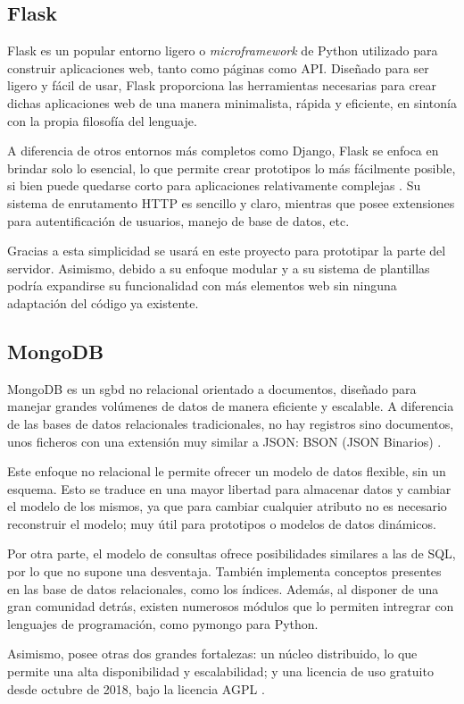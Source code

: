         \subsection{Flask}

            Flask es un popular entorno ligero o \textit{microframework} de Python utilizado para construir aplicaciones 
            web, tanto como páginas como API. Diseñado para ser ligero y fácil de usar, Flask proporciona las herramientas 
            necesarias para crear dichas aplicaciones web de una manera minimalista, rápida y eficiente, en sintonía con 
            la propia filosofía del lenguaje. 

            A diferencia de otros entornos más completos como Django, Flask se enfoca en brindar solo lo esencial, lo que 
            permite crear prototipos lo más fácilmente posible, si bien puede quedarse corto para aplicaciones 
            relativamente complejas \cite{rodriguez_flask_2014}. Su sistema de enrutamento HTTP es sencillo y claro, mientras que posee extensiones 
            para autentificación de usuarios, manejo de base de datos, etc. 

            Gracias a esta simplicidad se usará en este proyecto para prototipar la parte del servidor. Asimismo, debido a 
            su enfoque modular y a su sistema de plantillas podría expandirse su funcionalidad con más elementos web sin 
            ninguna adaptación del código ya existente.


        \subsection{MongoDB}
            MongoDB es un \gls{sgbd} no relacional orientado a documentos, diseñado para manejar 
            grandes volúmenes de datos de manera eficiente y escalable. A diferencia de las bases de datos relacionales 
            tradicionales, no hay registros sino documentos, unos ficheros con una extensión muy similar a JSON: BSON 
            (JSON Binarios) \cite{noauthor_json_nodate}. 

            Este enfoque no relacional le permite ofrecer un modelo de datos flexible, sin un esquema. Esto se traduce
            en una mayor libertad para almacenar datos y cambiar el modelo de los mismos, ya que para cambiar cualquier
            atributo no es necesario reconstruir el modelo; muy útil para prototipos o modelos de datos dinámicos.
            

            Por otra parte, el modelo de consultas ofrece posibilidades similares a las de SQL, por lo que no supone
            una desventaja. También implementa conceptos presentes en las base de datos relacionales, como los índices. 
            Además, al disponer de una gran comunidad detrás, existen numerosos módulos que lo permiten
            intregrar con lenguajes de programación, como pymongo para Python. 

            Asimismo, posee otras dos grandes fortalezas: un núcleo distribuido, lo que permite una alta disponibilidad
            y escalabilidad; y una licencia de uso gratuito desde octubre de 2018, bajo la licencia AGPL 
            \cite{noauthor_que_nodate}.